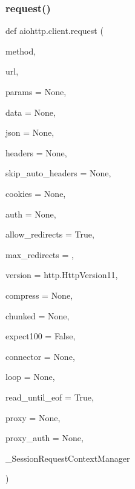 \subsubsection{\texorpdfstring{request()}{request()}}
{\footnotesize\ttfamily def aiohttp.\+client.\+request (\begin{DoxyParamCaption}\item[{}]{method,  }\item[{}]{url,  }\item[{}]{params = {\ttfamily None},  }\item[{}]{data = {\ttfamily None},  }\item[{}]{json = {\ttfamily None},  }\item[{}]{headers = {\ttfamily None},  }\item[{}]{skip\+\_\+auto\+\_\+headers = {\ttfamily None},  }\item[{}]{cookies = {\ttfamily None},  }\item[{}]{auth = {\ttfamily None},  }\item[{}]{allow\+\_\+redirects = {\ttfamily True},  }\item[{}]{max\+\_\+redirects = {},  }\item[{}]{version = {\ttfamily http.HttpVersion11},  }\item[{}]{compress = {\ttfamily None},  }\item[{}]{chunked = {\ttfamily None},  }\item[{}]{expect100 = {\ttfamily False},  }\item[{}]{connector = {\ttfamily None},  }\item[{}]{loop = {\ttfamily None},  }\item[{}]{read\+\_\+until\+\_\+eof = {\ttfamily True},  }\item[{}]{proxy = {\ttfamily None},  }\item[{}]{proxy\+\_\+auth = {\ttfamily None},  }\item[{}]{\+\_\+\+Session\+Request\+Context\+Manager }\end{DoxyParamCaption})}


